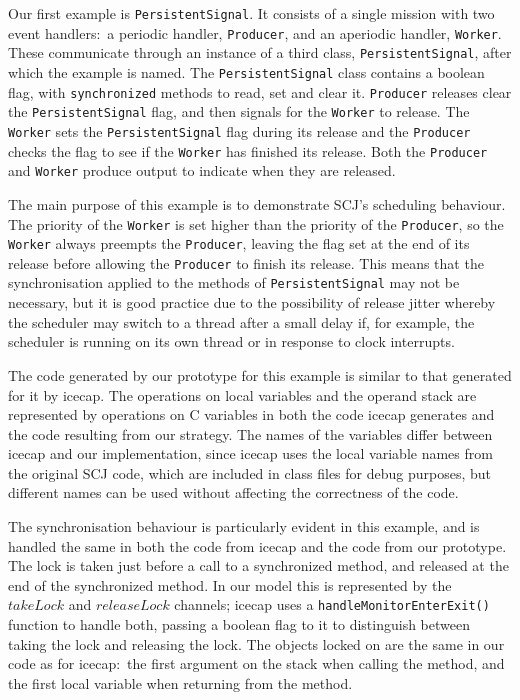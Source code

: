 Our first example is \texttt{PersistentSignal}. 
It consists of a single mission with two event handlers:~a periodic
handler, \texttt{Producer}, and an aperiodic handler, \texttt{Worker}.
These communicate through an instance of a third class,
\texttt{PersistentSignal}, after which the example is named.
The \texttt{PersistentSignal} class contains a boolean flag, with
\texttt{synchronized} methods to read, set and clear it.
\texttt{Producer} releases clear the \texttt{PersistentSignal} flag,
and then signals for the \texttt{Worker} to release.
The \texttt{Worker} sets the \texttt{PersistentSignal} flag during its
release and the \texttt{Producer} checks the flag to see if the
\texttt{Worker} has finished its release.
Both the \texttt{Producer} and \texttt{Worker} produce output to
indicate when they are released.

The main purpose of this example is to demonstrate SCJ's scheduling
behaviour.
The priority of the \texttt{Worker} is set higher than the priority of
the \texttt{Producer}, so the \texttt{Worker} always preempts the
\texttt{Producer}, leaving the flag set at the end of its release
before allowing the \texttt{Producer} to finish its release.
This means that the synchronisation applied to the methods of
\texttt{PersistentSignal} may not be necessary, but it is good
practice due to the possibility of release jitter whereby the
scheduler may switch to a thread after a small delay if, for example,
the scheduler is running on its own thread or in response to clock
interrupts.

The code generated by our prototype for this example is similar to
that generated for it by icecap.
The operations on local variables and the operand stack are
represented by operations on C variables in both the code icecap
generates and the code resulting from our strategy. 
The names of the variables differ between icecap and our
implementation, since icecap uses the local variable names from the
original SCJ code, which are included in class files for debug
purposes, but different names can be used without affecting the
correctness of the code.

The synchronisation behaviour is particularly evident in this example,
and is handled the same in both the code from icecap and the code from
our prototype.
The lock is taken just before a call to a synchronized method, and
released at the end of the synchronized method.
In our model this is represented by the $takeLock$ and $releaseLock$
channels; icecap uses a \texttt{handleMonitorEnterExit()} function to
handle both, passing a boolean flag to it to distinguish between taking
the lock and releasing the lock.
The objects locked on are the same in our code as for icecap:~the
first argument on the stack when calling the method, and the first
local variable when returning from the method.

